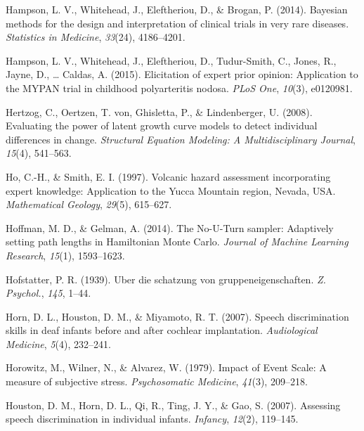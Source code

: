 \documentclass[openright,titlepage,12pt,a4paper]{book}
\begin{document}
\leavevmode\hypertarget{ref-hampson_bayesian_2014}{}%
Hampson, L. V., Whitehead, J., Eleftheriou, D., \& Brogan, P. (2014). Bayesian methods for the design and interpretation of clinical trials in very rare diseases. \emph{Statistics in Medicine}, \emph{33}(24), 4186--4201.

\leavevmode\hypertarget{ref-hampson_elicitation_2015}{}%
Hampson, L. V., Whitehead, J., Eleftheriou, D., Tudur-Smith, C., Jones, R., Jayne, D., \ldots{} Caldas, A. (2015). Elicitation of expert prior opinion: Application to the MYPAN trial in childhood polyarteritis nodosa. \emph{PLoS One}, \emph{10}(3), e0120981.

\leavevmode\hypertarget{ref-hertzog_evaluating_2008}{}%
Hertzog, C., Oertzen, T. von, Ghisletta, P., \& Lindenberger, U. (2008). Evaluating the power of latent growth curve models to detect individual differences in change. \emph{Structural Equation Modeling: A Multidisciplinary Journal}, \emph{15}(4), 541--563.

\leavevmode\hypertarget{ref-ho_volcanic_1997}{}%
Ho, C.-H., \& Smith, E. I. (1997). Volcanic hazard assessment incorporating expert knowledge: Application to the Yucca Mountain region, Nevada, USA. \emph{Mathematical Geology}, \emph{29}(5), 615--627.

\leavevmode\hypertarget{ref-hoffman_no-u-turn_2014}{}%
Hoffman, M. D., \& Gelman, A. (2014). The No-U-Turn sampler: Adaptively setting path lengths in Hamiltonian Monte Carlo. \emph{Journal of Machine Learning Research}, \emph{15}(1), 1593--1623.

\leavevmode\hypertarget{ref-hofstatter_uber_1939}{}%
Hofstatter, P. R. (1939). Uber die schatzung von gruppeneigenschaften. \emph{Z. Psychol.}, \emph{145}, 1--44.

\leavevmode\hypertarget{ref-horn_speech_2007}{}%
Horn, D. L., Houston, D. M., \& Miyamoto, R. T. (2007). Speech discrimination skills in deaf infants before and after cochlear implantation. \emph{Audiological Medicine}, \emph{5}(4), 232--241.

\leavevmode\hypertarget{ref-horowitz_impact_1979}{}%
Horowitz, M., Wilner, N., \& Alvarez, W. (1979). Impact of Event Scale: A measure of subjective stress. \emph{Psychosomatic Medicine}, \emph{41}(3), 209--218.

\leavevmode\hypertarget{ref-houston_assessing_2007}{}%
Houston, D. M., Horn, D. L., Qi, R., Ting, J. Y., \& Gao, S. (2007). Assessing speech discrimination in individual infants. \emph{Infancy}, \emph{12}(2), 119--145.
\end{document}
